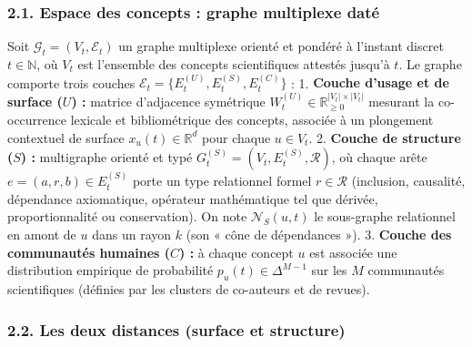 \documentclass[a4paper,11pt]{article}
\begin{document}
\subsubsection*{2.1. Espace des concepts : graphe multiplexe daté}

Soit \(\mathcal{G}_t = (V_t, \mathcal{E}_t)\) un graphe multiplexe
orienté et pondéré à l'instant discret \(t \in \mathbb{N}\), où \(V_t\)
est l'ensemble des concepts scientifiques attestés jusqu'à \(t\). Le
graphe comporte trois couches
\(\mathcal{E}_t = \{E^{(U)}_t, E^{(S)}_t, E^{(C)}_t\}\) : 1.
\textbf{Couche d'usage et de surface (\(U\)) :} matrice d'adjacence
symétrique \(W^{(U)}_t \in \mathbb{R}_{\ge 0}^{|V_t|\times |V_t|}\)
mesurant la co-occurrence lexicale et bibliométrique des concepts,
associée à un plongement contextuel de surface
\(x_u(t) \in \mathbb{R}^d\) pour chaque \(u \in V_t\). 2. \textbf{Couche
de structure (\(S\)) :} multigraphe orienté et typé
\(G^{(S)}_t = (V_t, E^{(S)}_t, \mathcal{R})\), où chaque arête
\(e = (a, r, b) \in E^{(S)}_t\) porte un type relationnel formel
\(r \in \mathcal{R}\) (inclusion, causalité, dépendance axiomatique,
opérateur mathématique tel que dérivée, proportionnalité ou
conservation). On note \(\mathcal{N}_S(u, t)\) le sous-graphe
relationnel en amont de \(u\) dans un rayon \(k\) (son « cône de
dépendances »). 3. \textbf{Couche des communautés humaines (\(C\)) :} à
chaque concept \(u\) est associée une distribution empirique de
probabilité \(p_u(t) \in \Delta^{M-1}\) sur les \(M\) communautés
scientifiques (définies par les clusters de co-auteurs et de revues).

\subsubsection*{2.2. Les deux distances (surface et structure)}
\end{document}
